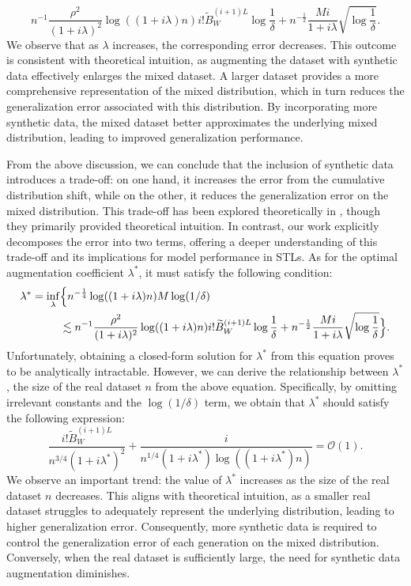 \begin{theorem}
\begin{remark}
$$
n^{-1} \frac{\rho^2}{(1+i \lambda)^2} \log ((1+i \lambda) n) i!\widetilde{B}_W^{(i+1) L} \log \frac{1}{\delta}+n^{-\frac{1}{2}} \frac{M i}{1+i \lambda} \sqrt{ \log \frac{1}{\delta}}.
$$
We observe that as $\lambda$ increases, the corresponding error decreases. This outcome is consistent with theoretical intuition, as augmenting the dataset with synthetic data effectively enlarges the mixed dataset. A larger dataset provides a more comprehensive representation of the mixed distribution, which in turn reduces the generalization error associated with this distribution. By incorporating more synthetic data, the mixed dataset better approximates the underlying mixed distribution, leading to improved generalization performance.

From the above discussion, we can conclude that the inclusion of synthetic data introduces a trade-off: on one hand, it increases the error from the cumulative distribution shift, while on the other, it reduces the generalization error on the mixed distribution. This trade-off has been explored theoretically in \cite{futowards}, though they primarily provided theoretical intuition. In contrast, our work explicitly decomposes the error into two terms, offering a deeper understanding of this trade-off and its implications for model performance in STLs. As for the optimal augmentation coefficient $\lambda^*$, it must satisfy the following condition:
\begin{align}
    \lambda^*=\inf_{\lambda} &\Big\{n^{-\frac{1}{4}} \log ((1+i \lambda) n) M \log (1 / \delta) \notag \\
    &\lesssim n^{-1} \frac{\rho^2}{(1+i \lambda)^2} \log ((1+i \lambda) n) i!\widetilde{B}_W^{(i+1) L} \log \frac{1}{\delta}+n^{-\frac{1}{2}} \frac{M i}{1+i \lambda} \sqrt{\log \frac{1}{\delta}}\Big\}. \notag
\end{align}
Unfortunately, obtaining a closed-form solution for $\lambda^*$ from this equation proves to be analytically intractable. However, we can derive the relationship between $\lambda^*$, the size of the real dataset $n$ from the above equation. Specifically, by
omitting irrelevant constants and the $\log(1/\delta)$ term, we obtain that $\lambda^*$ should satisfy the
following expression:
$$
\frac{i!\widetilde{B}_W^{(i+1) L}}{n^{3/4}(1+i\lambda^*)^2}+\frac{i}{n^{1/4}(1+i\lambda^*)\log((1+i\lambda^*)n)}=\mathcal{O}(1).$$
We observe an important trend: the value of $\lambda^*$ increases as the size of the real dataset $n$ decreases. This aligns with theoretical intuition, as a smaller real dataset struggles to adequately represent the underlying distribution, leading to higher generalization error. Consequently, more synthetic data is required to control the generalization error of each generation on the mixed distribution. Conversely, when the real dataset is sufficiently large, the need for synthetic data augmentation diminishes.







\end{remark}
\end{theorem}
